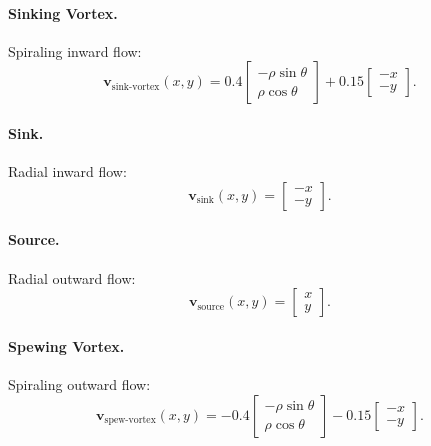 \documentclass[12pt, letterpaper, oneside]{report}
\begin{document}
\paragraph{Sinking Vortex.} Spiraling inward flow:
\begin{equation}
\mathbf{v}_{\text{sink-vortex}}(x,y) = 0.4\begin{bmatrix} -\rho\sin\theta \\ \rho\cos\theta \end{bmatrix} + 0.15\begin{bmatrix} -x \\ -y \end{bmatrix}.
\end{equation}

\paragraph{Sink.} Radial inward flow:
\begin{equation}
\mathbf{v}_{\text{sink}}(x,y) = \begin{bmatrix} -x \\ -y \end{bmatrix}.
\end{equation}

\paragraph{Source.} Radial outward flow:
\begin{equation}
\mathbf{v}_{\text{source}}(x,y) = \begin{bmatrix} x \\ y \end{bmatrix}.
\end{equation}

\paragraph{Spewing Vortex.} Spiraling outward flow:
\begin{equation}
\mathbf{v}_{\text{spew-vortex}}(x,y) = -0.4\begin{bmatrix} -\rho\sin\theta \\ \rho\cos\theta \end{bmatrix} - 0.15\begin{bmatrix} -x \\ -y \end{bmatrix}.
\end{equation}
\end{document}
